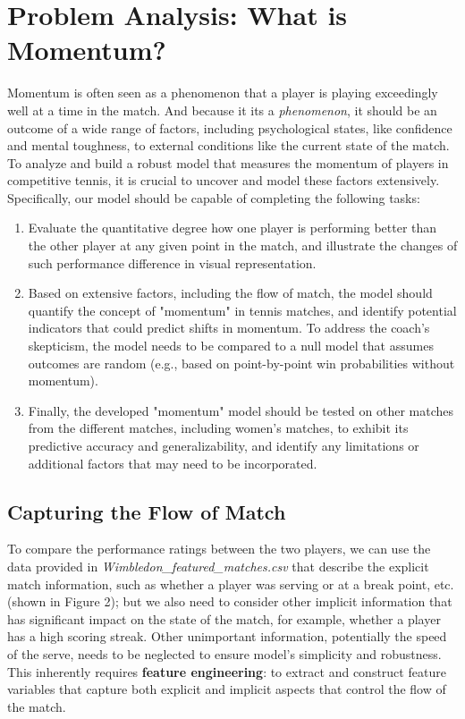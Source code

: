 \documentclass[12pt]{article}  %
\begin{document}
\section{Problem Analysis: What is Momentum?}

Momentum is often seen as a phenomenon that a player is playing exceedingly well at a time in the match. And because it its a \textit{phenomenon}, it should be an outcome of a wide range of factors, including psychological states, like confidence and mental toughness, to external conditions like the current state of the match. To analyze and build a robust model that measures the momentum of players in competitive tennis, it is crucial to uncover and model these factors extensively. Specifically, our model should be capable of completing the following tasks:

\begin{enumerate}[\bfseries (1)]
	\setlength{\parsep}{0ex} %
	\setlength{\topsep}{2ex} %
	\setlength{\itemsep}{1ex} %
	\item Evaluate the quantitative degree how one player is performing better than the other player at any given point in the match, and illustrate the changes of such performance difference in visual representation.
	\item Based on extensive factors, including the flow of match, the model should quantify the concept of "momentum" in tennis matches, and identify potential indicators that could predict shifts in momentum. To address the coach’s skepticism, the model needs to be compared to a null model that assumes outcomes are random (e.g., based on point-by-point win probabilities without momentum).
	\item Finally, the developed "momentum" model should be tested on other matches from the different matches, including women's matches, to exhibit its predictive accuracy and generalizability, and identify any limitations or additional factors that may need to be incorporated. 
\end{enumerate}

\subsection{Capturing the Flow of Match}
To compare the performance ratings between the two players, we can use the data provided in \textit{Wimbledon\_featured\_matches.csv} that describe the explicit match information, such as whether a player was serving or at a break point, etc. (shown in Figure 2); but we also need to consider other implicit information that has significant impact on the state of the match, for example, whether a player has a high scoring streak. Other unimportant information, potentially the speed of the serve, needs to be neglected to ensure model's simplicity and robustness. This inherently requires \textbf{feature engineering}: to extract and construct feature variables that capture both explicit and implicit aspects that control the flow of the match.
\end{document}
